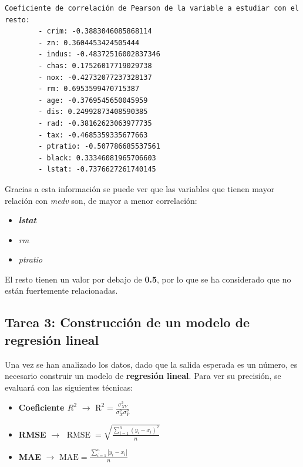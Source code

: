 \documentclass[11pt]{article}
\providecommand{\tightlist}{%
      \setlength{\itemsep}{0pt}\setlength{\parskip}{0pt}}
\begin{document}
    \begin{Verbatim}[commandchars=\\\{\}]
Coeficiente de correlación de Pearson de la variable a estudiar con el resto:
        - crim: -0.3883046085868114
        - zn: 0.3604453424505444
        - indus: -0.48372516002837346
        - chas: 0.17526017719029738
        - nox: -0.42732077237328137
        - rm: 0.6953599470715387
        - age: -0.3769545650045959
        - dis: 0.24992873408590385
        - rad: -0.38162623063977735
        - tax: -0.4685359335677663
        - ptratio: -0.507786685537561
        - black: 0.33346081965706603
        - lstat: -0.7376627261740145
    \end{Verbatim}

    Gracias a esta información se puede ver que las variables que tienen
mayor relación con \emph{medv} son, de mayor a menor correlación:

\begin{itemize}
\tightlist
\item
  \textbf{\emph{lstat}}
\item
  \emph{rm}
\item
  \emph{ptratio}
\end{itemize}

El resto tienen un valor por debajo de \textbf{0.5}, por lo que se ha
considerado que no están fuertemente relacionadas.

    \hypertarget{tarea-3-construcciuxf3n-de-un-modelo-de-regresiuxf3n-lineal}{%
\subsection{Tarea 3: Construcción de un modelo de regresión
lineal}\label{tarea-3-construcciuxf3n-de-un-modelo-de-regresiuxf3n-lineal}}

Una vez se han analizado los datos, dado que la salida esperada es un
número, es necesario construir un modelo de \textbf{regresión lineal}.
Para ver su precisión, se evaluará con las siguientes técnicas:

\begin{itemize}
\item
  \textbf{Coeficiente \(R^2\)} \(\rightarrow\)
  \(\displaystyle \mathrm {R^2} = \frac{\sigma^2_{XY}}{\sigma^2_X \sigma^2_Y}\)
\item
  \textbf{RMSE} \(\rightarrow\)
  \(\displaystyle \operatorname {RMSE} ={\sqrt {\frac {\sum _{i=1}^{n}(y_{i}-x_{i})^{2}}{n}}}\)
\item
  \textbf{MAE} \(\rightarrow\)
  \(\displaystyle \mathrm {MAE} ={\frac {\sum _{i=1}^{n}|y_{i}-x_{i}|}{n}}\)
\end{itemize}
\end{document}
